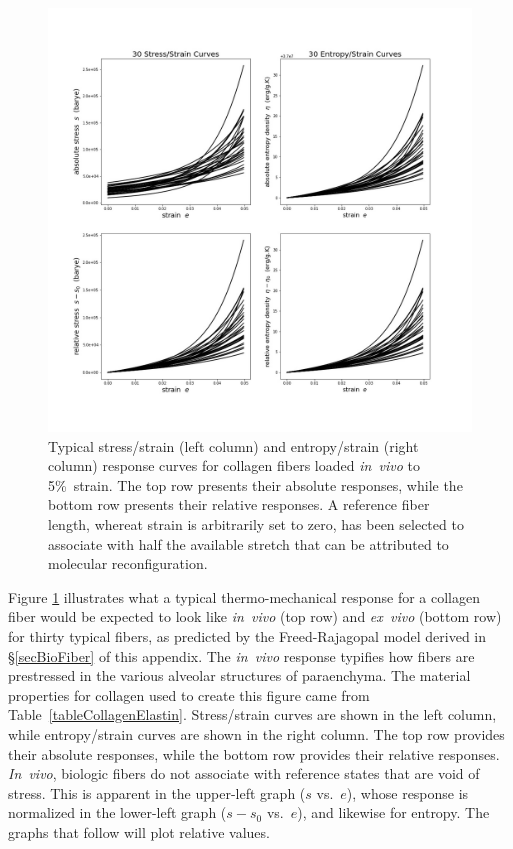 \begin{figure}
    \includegraphics[width=\textwidth]{figures/bioFibers5.jpg}
    \caption{Typical stress\slash strain (left column) and entropy\slash strain (right column) response curves for collagen fibers loaded \textit{in~vivo\/} to 5\%\ strain. The top row presents their absolute responses, while the bottom row presents their relative responses.  A reference fiber length, whereat strain is arbitrarily set to zero, has been selected to associate with half the available stretch that can be attributed to molecular reconfiguration.}
    \label{figCollagenFibersInVivo}
\end{figure}

Figure \ref{figCollagenFibersInVivo} illustrates what a typical thermo-mechanical response for a collagen fiber would be expected to look like \textit{in~vivo\/} (top row) and \textit{ex~vivo\/} (bottom row) for thirty typical fibers, as predicted by the Freed-Rajagopal \cite{FreedRajagopal16} model derived in \S\ref{secBioFiber} of this appendix.  The \textit{in~vivo\/} response typifies how fibers are prestressed in the various alveolar structures of paraenchyma.  The material properties for collagen used to create this figure came from Table~\ref{tableCollagenElastin}. Stress\slash strain curves are shown in the left column, while entropy\slash strain curves are shown in the right column.  The top row provides their absolute responses, while the bottom row provides their relative responses.  \textit{In~vivo}, biologic fibers do not associate with reference states that are void of stress.  This is apparent in the upper-left graph ($s$ vs.\ $e$), whose response is normalized in the lower-left graph ($s \! - \! s_0$ vs.\ $e$), and likewise for entropy.  The graphs that follow will plot relative values.

